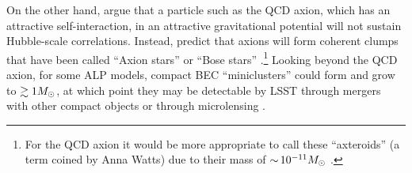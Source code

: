 On the other hand, \citet{1412.5930} argue that a particle such as the QCD axion, which has an attractive self-interaction, in an attractive gravitational potential will not sustain Hubble-scale correlations.
Instead, \citet{1412.5930} predict that axions will form coherent clumps that have been called ``Axion stars'' or ``Bose stars'' \citep[\eg][]{Kolb:1993}.\footnote{For the QCD axion it would be more appropriate to call these ``axteroids'' (a term coined by Anna Watts) due to their mass of $ {\sim}\, 10^{-11} M_\odot$ \citep{???}.} 
Looking beyond the QCD axion, for some ALP models, compact BEC ``miniclusters'' could form and grow to $\gtrsim 1M_\odot$, at which point they may be detectable by LSST through mergers with other compact objects \citep{1808.04746} or through microlensing \citep{1707.03310}.




